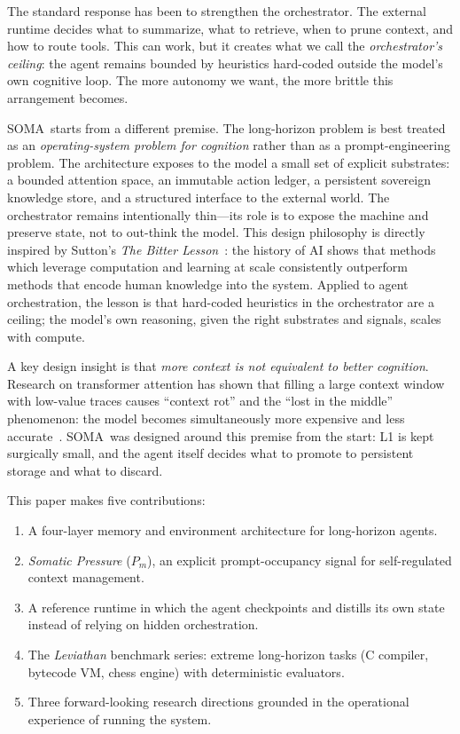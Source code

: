 \documentclass[11pt,a4paper]{article}
\newcommand{\soma}{\textsc{SOMA}}
\newcommand{\Pm}{\ensuremath{P_m}}
\begin{document}
The standard response has been to strengthen the orchestrator.
The external runtime decides what to summarize, what to retrieve, when to prune
context, and how to route tools.
This can work, but it creates what we call the \textit{orchestrator's ceiling}:
the agent remains bounded by heuristics hard-coded outside the model's own
cognitive loop.
The more autonomy we want, the more brittle this arrangement becomes.

\soma\ starts from a different premise.
The long-horizon problem is best treated as an \emph{operating-system problem
for cognition} rather than as a prompt-engineering problem.
The architecture exposes to the model a small set of explicit substrates:
a bounded attention space, an immutable action ledger, a persistent sovereign
knowledge store, and a structured interface to the external world.
The orchestrator remains intentionally thin---its role is to expose the machine
and preserve state, not to out-think the model.
This design philosophy is directly inspired by Sutton's \textit{The Bitter
Lesson}~\cite{sutton2019bitter}: the history of AI shows that methods which
leverage computation and learning at scale consistently outperform methods
that encode human knowledge into the system.
Applied to agent orchestration, the lesson is that hard-coded heuristics in
the orchestrator are a ceiling; the model's own reasoning, given the right
substrates and signals, scales with compute.

A key design insight is that \emph{more context is not equivalent to better
cognition}.
Research on transformer attention has shown that filling a large context window
with low-value traces causes ``context rot'' and the ``lost in the middle''
phenomenon: the model becomes simultaneously more expensive and less
accurate~\cite{liu2023lost}.
\soma\ was designed around this premise from the start: L1 is kept surgically
small, and the agent itself decides what to promote to persistent storage and
what to discard.

This paper makes five contributions:
\begin{enumerate}[leftmargin=*]
  \item A four-layer memory and environment architecture for long-horizon agents.
  \item \textit{Somatic Pressure} (\Pm), an explicit prompt-occupancy signal
        for self-regulated context management.
  \item A reference runtime in which the agent checkpoints and distills its own
        state instead of relying on hidden orchestration.
  \item The \textit{Leviathan} benchmark series: extreme long-horizon tasks
        (C compiler, bytecode VM, chess engine) with deterministic evaluators.
  \item Three forward-looking research directions grounded in the operational
        experience of running the system.
\end{enumerate}
\end{document}
